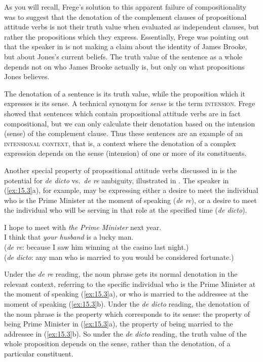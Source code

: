 As you will recall, Frege’s solution to this apparent failure of compositionality was to suggest that the denotation of the complement clauses of propositional attitude verbs is not their truth value when evaluated as independent clauses, but rather the propositions which they express. Essentially, Frege was pointing out that the speaker in  is not making a claim about the identity of James Brooke, but about Jones’s current beliefs. The truth value of the sentence as a whole depends not on who James Brooke actually is, but only on what propositions Jones believes.



The denotation of a sentence is its truth value, while the proposition which it expresses is its sense. A technical synonym for \textit{sense} is the term \textsc{intension}. Frege showed that sentences which contain propositional attitude verbs are in fact compositional, but we can only calculate their denotation based on the intension (sense) of the complement clause. Thus these sentences are an example of an \textsc{intensional context}, that is, a context where the denotation of a complex expression depends on the sense (intension) of one or more of its constituents.



Another special property of propositional attitude verbs discussed in  is the potential for \textit{de dicto} vs.~\textit{de re} ambiguity, illustrated in . The speaker in (\ref{ex:15.3}a), for example, may be expressing either a desire to meet the individual who is the Prime Minister at the moment of speaking (\textit{de re}), or a desire to meet the individual who will be serving in that role at the specified time (\textit{de dicto}).


\ea \label{ex:15.3}
\ea  I hope to meet with \textit{the Prime Minister} next year.\\
\ex I think that \textit{your husband} is a lucky man.\\
  (\textit{de re}: because I saw him winning at the casino last night.)\\
  (\textit{de dicto}: any man who is married to you would be considered fortunate.)
                       \z
\z


Under the \textit{de re} reading, the noun phrase gets its normal denotation in the relevant context, referring to the specific individual who is the Prime Minister at the moment of speaking (\ref{ex:15.3}a), or who is married to the addressee at the moment of speaking (\ref{ex:15.3}b). Under the \textit{de dicto} reading, the denotation of the noun phrase is the property which corresponds to its sense: the property of being Prime Minister in (\ref{ex:15.3}a), the property of being married to the addressee in (\ref{ex:15.3}b). So under the \textit{de dicto} reading, the truth value of the whole proposition depends on the sense, rather than the denotation, of a particular constituent.



